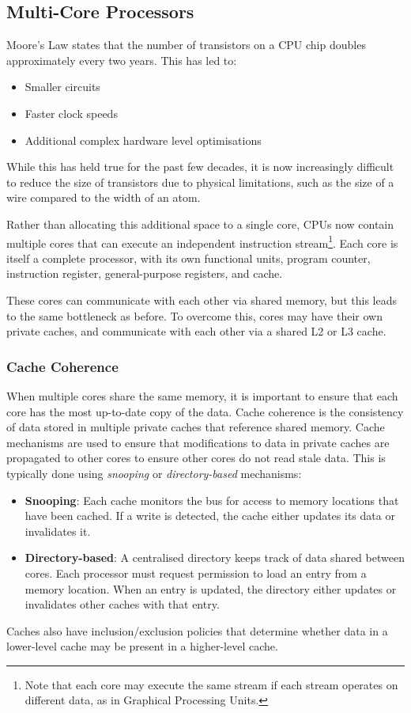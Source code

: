 \documentclass{article}
\newenvironment{aside}[1][]
  {\begin{mdframed}[style=0,%
      leftline=false,rightline=false,leftmargin=2em,rightmargin=2em,%
          innerleftmargin=0pt,innerrightmargin=0pt,linewidth=0.75pt,%
      skipabove=7pt,skipbelow=7pt,#1]\small}
  {\end{mdframed}}
\begin{document}
\subsection{Multi-Core Processors}
\begin{aside}[frametitle={Moore's Law}]
    Moore's Law states that the number of transistors on a CPU chip doubles
    approximately every two years. This has led to:
    \begin{itemize}
        \item Smaller circuits
        \item Faster clock speeds
        \item Additional complex hardware level optimisations
    \end{itemize}
    While this has held true for the past few decades, it is now
    increasingly difficult to reduce the size of transistors due to physical
    limitations, such as the size of a wire compared to the width of an atom.
\end{aside}
Rather than allocating this additional space to a single core, CPUs now
contain multiple cores that can execute an independent instruction
stream\footnote{Note that each core may execute the same stream if each
    stream operates on different data, as in Graphical Processing Units.}.
Each core is itself a complete processor, with its own functional units,
program counter, instruction register, general-purpose registers, and
cache.

These cores can communicate with each other via shared memory, but this
leads to the same bottleneck as before. To overcome this, cores may
have their own private caches, and communicate with each other via a
shared L2 or L3 cache.
\subsubsection{Cache Coherence}
When multiple cores share the same memory, it is important to ensure
that each core has the most up-to-date copy of the data. Cache
coherence is the consistency of data stored in multiple private caches
that reference shared memory. Cache mechanisms are used to ensure that
modifications to data in private caches are propagated to other cores
to ensure other cores do not read stale data. This is typically done
using \textit{snooping} or \textit{directory-based} mechanisms:
\begin{itemize}
    \item \textbf{Snooping}: Each cache monitors the bus for
          access to memory locations that have been cached. If a write
          is detected, the cache either updates its data or invalidates
          it.
    \item \textbf{Directory-based}: A centralised directory keeps track
          of data shared between cores. Each processor must request
          permission to load an entry from a memory location. When an
          entry is updated, the directory either updates or invalidates
          other caches with that entry.
\end{itemize}
Caches also have inclusion/exclusion policies that determine whether
data in a lower-level cache may be present in a higher-level cache.
\end{document}
